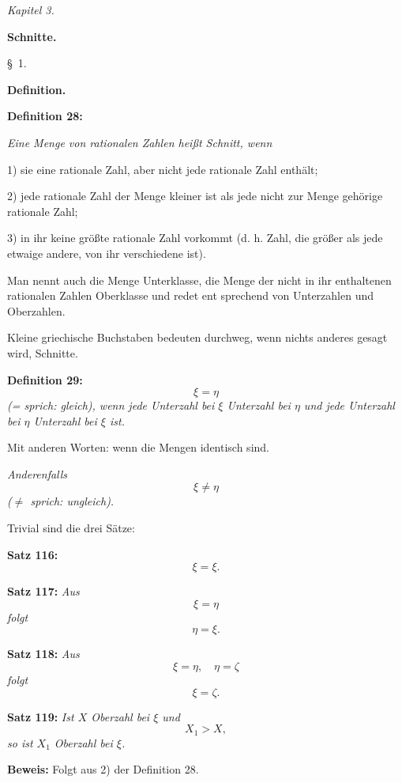 
\line{}\baselineskip
\centerline{\sl Kapitel 3.}
\medskip

\centerline{\bf Schnitte.}
\bigskip

\centerline{{\S}~1.}
\medskip

\centerline{\bf Definition.}
\bigskip

{\bf Definition 28:} {\it Eine Menge von rationalen Zahlen hei{\ss}t Schnitt, wenn

1) sie eine rationale Zahl, aber nicht jede rationale Zahl enth\"alt;

2) jede rationale Zahl der Menge kleiner ist als jede nicht zur
Menge geh\"orige rationale Zahl;

3) in ihr keine gr\"o{\ss}te rationale Zahl vorkommt {\rm (d. h. Zahl, die
gr\"o{\ss}er als jede etwaige andere, von ihr verschiedene ist).}}

Man nennt auch die Menge Unterklasse, die Menge der nicht
in ihr enthaltenen rationalen Zahlen Oberklasse und redet ent%
sprechend von Unterzahlen und Oberzahlen.

Kleine griechische Buchstaben bedeuten durchweg, wenn nichts
anderes gesagt wird, Schnitte.
\medskip


{\bf Definition 29:} {\it $$\xi = \eta$$
{\rm (= sprich: gleich),} wenn jede Unterzahl bei $\xi$ Unterzahl bei $\eta$ und
jede Unterzahl bei $\eta$ Unterzahl bei $\xi$ ist.}

Mit anderen Worten: wenn die Mengen identisch sind.

{\it Anderenfalls
$$\xi \ne \eta$$
{\rm ($\ne$ sprich: ungleich).}}

Trivial sind die drei S\"atze:
\medskip


{\bf Satz 116:} {\it $$\xi = \xi.$$}%
\medskip


{\bf Satz 117:} {\it Aus
$$\xi = \eta$$
folgt
$$\eta = \xi.$$}%
\medskip


{\bf Satz 118:} {\it Aus
$$\xi = \eta,\quad \eta = \zeta$$
folgt
$$\xi = \zeta.$$}%
\medskip


{\bf Satz 119:} {\it Ist $X$ Oberzahl bei $\xi$ und
$$X_1 > X,$$
so ist $X_1$ Oberzahl bei $\xi$.}

{\bf Beweis:} Folgt aus 2) der Definition 28.
\medskip

